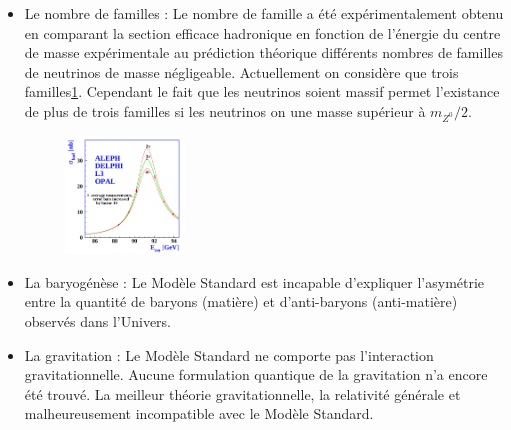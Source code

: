 \begin{itemize}[label=$\bullet$]
\item Le nombre de familles : Le nombre de famille a été expérimentalement obtenu en comparant la section efficace hadronique en fonction de l'énergie du centre de masse expérimentale au prédiction théorique différents nombres de familles de neutrinos de masse négligeable. Actuellement on considère que trois familles\ref{neutrinos}. Cependant le fait que les neutrinos soient massif permet l'existance de plus de trois familles si les neutrinos on une masse supérieur à $m_{Z^{0}}/2$.
\begin{figure}[h!]
\centering
\includegraphics[width=0.30\textwidth]{SM/neutrinos.png}
\label{neutrinos}
\end{figure}

\item La baryogénèse : Le Modèle Standard est incapable d'expliquer l'asymétrie entre la quantité de baryons (matière) et d'anti-baryons (anti-matière) observés dans l'Univers.

\item La gravitation : Le Modèle Standard ne comporte pas l'interaction gravitationnelle. Aucune formulation quantique de la gravitation n'a encore été trouvé. La meilleur théorie gravitationnelle, la relativité générale et malheureusement incompatible avec le Modèle Standard.


\end{itemize}
